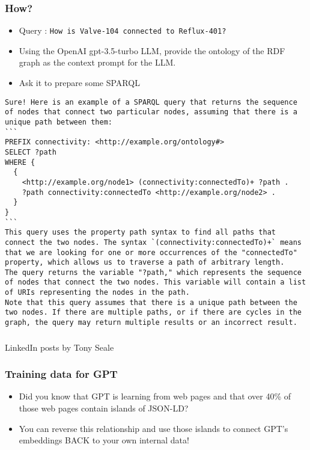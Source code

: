 \begin{frame}[fragile]\frametitle{How?}

\begin{itemize}
\item Query : \lstinline|How is Valve-104 connected to Reflux-401?|
\item Using the OpenAI gpt-3.5-turbo LLM, provide the ontology of the RDF graph as the context prompt for the LLM.
\item Ask it to prepare some SPARQL
\end{itemize}	

\begin{lstlisting}
Sure! Here is an example of a SPARQL query that returns the sequence of nodes that connect two particular nodes, assuming that there is a unique path between them:
```
PREFIX connectivity: <http://example.org/ontology#>
SELECT ?path
WHERE {
  {
    <http://example.org/node1> (connectivity:connectedTo)+ ?path .
    ?path connectivity:connectedTo <http://example.org/node2> .
  }
}
```
This query uses the property path syntax to find all paths that connect the two nodes. The syntax `(connectivity:connectedTo)+` means that we are looking for one or more occurrences of the "connectedTo" property, which allows us to traverse a path of arbitrary length.
The query returns the variable "?path," which represents the sequence of nodes that connect the two nodes. This variable will contain a list of URIs representing the nodes in the path.
Note that this query assumes that there is a unique path between the two nodes. If there are multiple paths, or if there are cycles in the graph, the query may return multiple results or an incorrect result.
\end{lstlisting}

\end{frame}


\begin{frame}[fragile]\frametitle{}
\begin{center}
{\Large LinkedIn posts by Tony Seale}
\end{center}
\end{frame}

\begin{frame}[fragile]\frametitle{Training data for GPT}

\begin{itemize}
\item Did you know that GPT is learning from web pages and that over 40\% of those web pages contain islands of JSON-LD?
\item You can reverse this relationship and use those islands to connect GPT's embeddings BACK to your own internal data!
\end{itemize}
	  
\end{frame}

